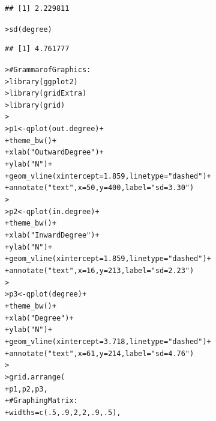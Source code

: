 \documentclass[12pt]{article}\usepackage[]{graphicx}\usepackage[]{color}
\makeatletter
\newcommand{\hlnum}[1]{\textcolor[rgb]{0.82,0.78,0.62}{#1}}%
\newcommand{\hlstr}[1]{\textcolor[rgb]{0.82,0.78,0.62}{#1}}%
\newcommand{\hlcom}[1]{\textcolor[rgb]{0.404,0.408,0.42}{#1}}%
\newcommand{\hlopt}[1]{\textcolor[rgb]{0.882,0.878,0.898}{#1}}%
\newcommand{\hlstd}[1]{\textcolor[rgb]{0.882,0.878,0.898}{#1}}%
\newcommand{\hlkwb}[1]{\textcolor[rgb]{0.902,0.675,0.196}{#1}}%
\newcommand{\hlkwc}[1]{\textcolor[rgb]{0.812,0.522,0.388}{#1}}%
\newcommand{\hlkwd}[1]{\textcolor[rgb]{0.733,0.388,0.812}{#1}}%
\newenvironment{kframe}{%
 \def\at@end@of@kframe{}%
 \ifinner\ifhmode%
  \def\at@end@of@kframe{\end{minipage}}%
  \begin{minipage}{\columnwidth}%
 \fi\fi%
 \def\FrameCommand##1{\hskip\@totalleftmargin \hskip-\fboxsep
 \colorbox{shadecolor}{##1}\hskip-\fboxsep
     \hskip-\linewidth \hskip-\@totalleftmargin \hskip\columnwidth}%
 \MakeFramed {\advance\hsize-\width
   \@totalleftmargin\z@ \linewidth\hsize
   \@setminipage}}%
 {\par\unskip\endMakeFramed%
 \at@end@of@kframe}
\newenvironment{knitrout}{}{} %
\makeatother
\begin{document}
\begin{flushleft}
\begin{center}
\begin{knitrout}
\begin{kframe}
\begin{verbatim}
## [1] 2.229811
\end{verbatim}
\begin{alltt}
\hlstd{> }\hlkwd{sd}\hlstd{(degree)}
\end{alltt}
\begin{verbatim}
## [1] 4.761777
\end{verbatim}
\begin{alltt}
\hlstd{> }\hlcom{# Grammar of Graphics:}
\hlstd{> }\hlkwd{library}\hlstd{(ggplot2)}
\hlstd{> }\hlkwd{library}\hlstd{(gridExtra)}
\hlstd{> }\hlkwd{library}\hlstd{(grid)}
\hlstd{> }
\hlstd{> }\hlstd{p1} \hlkwb{<-} \hlkwd{qplot}\hlstd{(out.degree)}\hlopt{+}
\hlstd{+ }     \hlkwd{theme_bw}\hlstd{()}\hlopt{+}
\hlstd{+ }     \hlkwd{xlab}\hlstd{(}\hlstr{"Outward Degree"}\hlstd{)}\hlopt{+}
\hlstd{+ }     \hlkwd{ylab}\hlstd{(}\hlstr{"N"}\hlstd{)}\hlopt{+}
\hlstd{+ }     \hlkwd{geom_vline}\hlstd{(}\hlkwc{xintercept}\hlstd{=}\hlnum{1.859}\hlstd{,} \hlkwc{linetype}\hlstd{=}\hlstr{"dashed"}\hlstd{)}\hlopt{+}
\hlstd{+ }     \hlkwd{annotate}\hlstd{(}\hlstr{"text"}\hlstd{,} \hlkwc{x} \hlstd{=} \hlnum{50}\hlstd{,} \hlkwc{y} \hlstd{=} \hlnum{400}\hlstd{,} \hlkwc{label} \hlstd{=} \hlstr{"sd = 3.30"}\hlstd{)}
\hlstd{> }
\hlstd{> }\hlstd{p2} \hlkwb{<-} \hlkwd{qplot}\hlstd{(in.degree)}\hlopt{+}
\hlstd{+ }     \hlkwd{theme_bw}\hlstd{()}\hlopt{+}
\hlstd{+ }     \hlkwd{xlab}\hlstd{(}\hlstr{"Inward Degree"}\hlstd{)}\hlopt{+}
\hlstd{+ }     \hlkwd{ylab}\hlstd{(}\hlstr{"N"}\hlstd{)}\hlopt{+}
\hlstd{+ }     \hlkwd{geom_vline}\hlstd{(}\hlkwc{xintercept}\hlstd{=}\hlnum{1.859}\hlstd{,} \hlkwc{linetype}\hlstd{=}\hlstr{"dashed"}\hlstd{)}\hlopt{+}
\hlstd{+ }     \hlkwd{annotate}\hlstd{(}\hlstr{"text"}\hlstd{,} \hlkwc{x} \hlstd{=} \hlnum{16}\hlstd{,} \hlkwc{y} \hlstd{=} \hlnum{213}\hlstd{,} \hlkwc{label} \hlstd{=} \hlstr{"sd = 2.23"}\hlstd{)}
\hlstd{> }
\hlstd{> }\hlstd{p3} \hlkwb{<-} \hlkwd{qplot}\hlstd{(degree)}\hlopt{+}
\hlstd{+ }     \hlkwd{theme_bw}\hlstd{()}\hlopt{+}
\hlstd{+ }     \hlkwd{xlab}\hlstd{(}\hlstr{"Degree"}\hlstd{)}\hlopt{+}
\hlstd{+ }     \hlkwd{ylab}\hlstd{(}\hlstr{"N"}\hlstd{)}\hlopt{+}
\hlstd{+ }     \hlkwd{geom_vline}\hlstd{(}\hlkwc{xintercept}\hlstd{=}\hlnum{3.718}\hlstd{,} \hlkwc{linetype}\hlstd{=}\hlstr{"dashed"}\hlstd{)}\hlopt{+}
\hlstd{+ }     \hlkwd{annotate}\hlstd{(}\hlstr{"text"}\hlstd{,} \hlkwc{x} \hlstd{=} \hlnum{61}\hlstd{,} \hlkwc{y} \hlstd{=} \hlnum{214}\hlstd{,} \hlkwc{label} \hlstd{=} \hlstr{"sd = 4.76"}\hlstd{)}
\hlstd{> }
\hlstd{> }\hlkwd{grid.arrange}\hlstd{(}
\hlstd{+ }     \hlstd{p1, p2, p3,}
\hlstd{+ }     \hlcom{# Graphing Matrix:}
\hlstd{+ }     \hlkwc{widths} \hlstd{=} \hlkwd{c}\hlstd{(}\hlnum{.5}\hlstd{,} \hlnum{.9} \hlstd{,}\hlnum{2}\hlstd{,} \hlnum{2}\hlstd{,} \hlnum{.9}\hlstd{,} \hlnum{.5}\hlstd{),}

\end{alltt}
\end{kframe}
\end{knitrout}
\end{center}
\end{flushleft}
\end{document}
